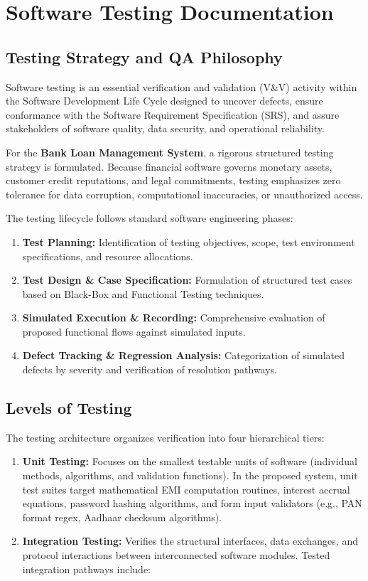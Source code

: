 \chapter{Software Testing Documentation}

\section{Testing Strategy and QA Philosophy}

Software testing is an essential verification and validation (V\&V) activity within the Software Development Life Cycle designed to uncover defects, ensure conformance with the Software Requirement Specification (SRS), and assure stakeholders of software quality, data security, and operational reliability.

For the \textbf{Bank Loan Management System}, a rigorous structured testing strategy is formulated. Because financial software governs monetary assets, customer credit reputations, and legal commitments, testing emphasizes zero tolerance for data corruption, computational inaccuracies, or unauthorized access.

The testing lifecycle follows standard software engineering phases:

\begin{enumerate}
  \item \textbf{Test Planning:} Identification of testing objectives, scope, test environment specifications, and resource allocations.
  \item \textbf{Test Design \& Case Specification:} Formulation of structured test cases based on Black-Box and Functional Testing techniques.
  \item \textbf{Simulated Execution \& Recording:} Comprehensive evaluation of proposed functional flows against simulated inputs.
  \item \textbf{Defect Tracking \& Regression Analysis:} Categorization of simulated defects by severity and verification of resolution pathways.
\end{enumerate}

\section{Levels of Testing}

The testing architecture organizes verification into four hierarchical tiers:

\begin{enumerate}
  \item \textbf{Unit Testing:} Focuses on the smallest testable units of software (individual methods, algorithms, and validation functions). In the proposed system, unit test suites target mathematical EMI computation routines, interest accrual equations, password hashing algorithms, and form input validators (e.g., PAN format regex, Aadhaar checksum algorithms).
  \item \textbf{Integration Testing:} Verifies the structural interfaces, data exchanges, and protocol interactions between interconnected software modules. Tested integration pathways include:
\end{enumerate}

